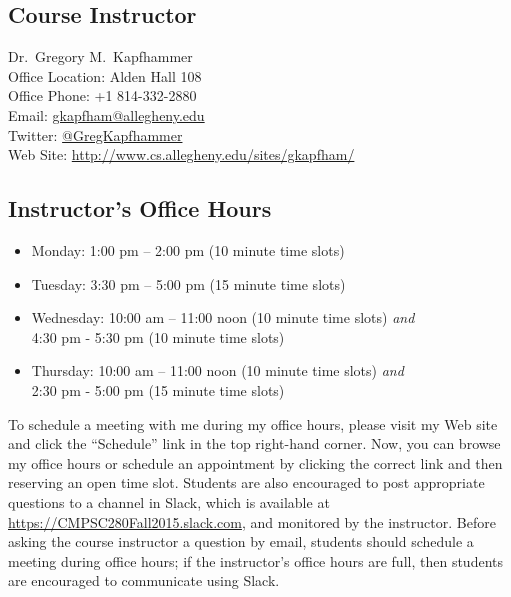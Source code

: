 

\usepackage[compact]{titlesec}



\subsection*{Course Instructor}
Dr.\ Gregory M.\ Kapfhammer\\
\noindent Office Location: Alden Hall 108 \\
\noindent Office Phone: +1 814-332-2880 \\
\noindent Email: \url{gkapfham@allegheny.edu} \\
\noindent Twitter: \url{@GregKapfhammer} \\
\noindent Web Site: \url{http://www.cs.allegheny.edu/sites/gkapfham/}

\subsection*{Instructor's Office Hours}

\begin{itemize}
  \itemsep .5em
  \item Monday: 1:00 pm -- 2:00 pm (10 minute time slots)
  \item Tuesday: 3:30 pm -- 5:00 pm (15 minute time slots)
  \item Wednesday: 10:00 am -- 11:00 noon (10 minute time slots) {\em and} \\ \hspace*{.8in}
    4:30 pm - 5:30 pm (10 minute time slots)
  \item Thursday: 10:00 am -- 11:00 noon (10 minute time slots) {\em and} \\ \hspace*{.8in}
    2:30 pm - 5:00 pm (15 minute time slots)
\end{itemize}

\noindent To schedule a meeting with me during my office hours, please visit my Web site and click the ``Schedule'' link
in the top right-hand corner. Now, you can browse my office hours or schedule an appointment by clicking the correct
link and then reserving an open time slot. Students are also encouraged to post appropriate questions to a channel in
Slack, which is available at \url{https://CMPSC280Fall2015.slack.com}, and monitored by the instructor.  Before asking
the course instructor a question by email, students should schedule a meeting during office hours; if the instructor's
office hours are full, then students are encouraged to communicate using Slack.

